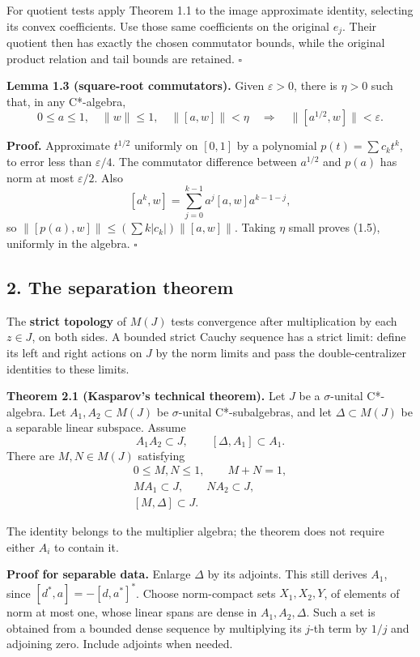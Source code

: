 \documentclass[
  11pt,
]{article}
\begin{document}
For quotient tests apply Theorem 1.1 to the image approximate identity,
selecting its convex coefficients. Use those same coefficients on the
original \(e_j\). Their quotient then has exactly the chosen commutator
bounds, while the original product relation and tail bounds are
retained. \(\square\)

\textbf{Lemma 1.3 (square-root commutators).} Given \(\varepsilon>0\),
there is \(\eta>0\) such that, in any C*-algebra, \[
0\leq a\leq1,\quad\|w\|\leq1,\quad
\|[a,w]\|<\eta
\quad\Longrightarrow\quad
\|[a^{1/2},w]\|<\varepsilon.
\tag{1.5}
\]

\textbf{Proof.} Approximate \(t^{1/2}\) uniformly on \([0,1]\) by a
polynomial \(p(t)=\sum c_kt^k\), to error less than \(\varepsilon/4\).
The commutator difference between \(a^{1/2}\) and \(p(a)\) has norm at
most \(\varepsilon/2\). Also \[
[a^k,w]=\sum_{j=0}^{k-1}a^j[a,w]a^{k-1-j},
\] so \(\|[p(a),w]\|\leq(\sum k|c_k|)\|[a,w]\|\). Taking \(\eta\) small
proves (1.5), uniformly in the algebra. \(\square\)

\subsection{2. The separation theorem}\label{the-separation-theorem}

The \textbf{strict topology} of \(M(J)\) tests convergence after
multiplication by each \(z\in J\), on both sides. A bounded strict
Cauchy sequence has a strict limit: define its left and right actions on
\(J\) by the norm limits and pass the double-centralizer identities to
these limits.

\textbf{Theorem 2.1 (Kasparov's technical theorem).} Let \(J\) be a
\(\sigma\)-unital C*-algebra. Let \(A_1,A_2\subset M(J)\) be
\(\sigma\)-unital C*-subalgebras, and let \(\Delta\subset M(J)\) be a
separable linear subspace. Assume \[
A_1A_2\subset J,\qquad [\Delta,A_1]\subset A_1.
\tag{2.1}
\] There are \(M,N\in M(J)\) satisfying \[
\begin{gathered}
0\leq M,N\leq1,\qquad M+N=1,\\
MA_1\subset J,\qquad NA_2\subset J,\\
[M,\Delta]\subset J.
\end{gathered}
\tag{2.2}
\]

The identity belongs to the multiplier algebra; the theorem does not
require either \(A_i\) to contain it.

\textbf{Proof for separable data.} Enlarge \(\Delta\) by its adjoints.
This still derives \(A_1\), since \([d^*,a]=-[d,a^*]^*\). Choose
norm-compact sets \(X_1,X_2,Y\), of elements of norm at most one, whose
linear spans are dense in \(A_1,A_2,\Delta\). Such a set is obtained
from a bounded dense sequence by multiplying its \(j\)-th term by
\(1/j\) and adjoining zero. Include adjoints when needed.
\end{document}
